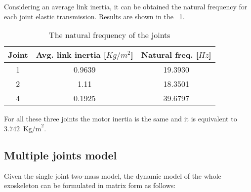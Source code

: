 Considering an average link inertia, it can be obtained the natural frequency for each joint elastic transmission. Results are shown in the \tablename \ \ref{tab:naturalFrequencies}.
\begin{table}[!t]
	\renewcommand{\arraystretch}{1.3}
	\caption{The natural frequency of the joints}
	\label{tab:naturalFrequencies}
	\centering
	\begin{tabular}{c c c}
		\hline \hline
		\bfseries Joint & \bfseries Avg. link inertia [$Kg/m^2$] & \bfseries Natural freq. [$Hz$]\\
		\hline
		1 & 0.9639 & 19.3930\\
		2 & 1.11 & 18.3501\\
		4 & 0.1925 & 39.6797\\
		\hline \hline
	\end{tabular}
\end{table}
For all these three joints the motor inertia is the same and it is equivalent to $3.742 \, \text{ Kg/m}^2$.


\subsection{Multiple joints model} \label{Full dynamics model}

Given the single joint two-mass model, the dynamic model of the whole exoskeleton can be formulated in matrix form as follows:
\setlength{\arraycolsep}{0.0em}


